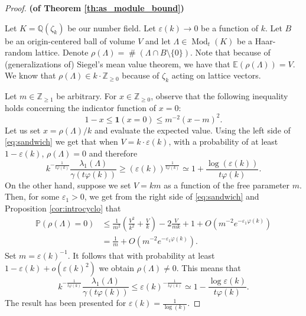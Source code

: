 \documentclass{amsart}
\DeclareMathOperator{\ML}{Mod}
\DeclareMathOperator{\card}{\texttt{\#}}
\begin{document}
 \begin{proof} 
 {\bf (of Theorem \ref{th:as_module_bound})}

 Let $K = \mathbb{Q}(\zeta_{k})$ be our number field. Let $\varepsilon(k)\rightarrow 0$ be a function of $k$.
 Let $B$ be an origin-centered ball of volume $V$ and let $\Lambda \in \ML_{t}(K)$ be a Haar-random lattice.
 Denote $\rho(\Lambda) = \card ( \Lambda \cap B \setminus \{0\} )$.
 Note that because of (generalizations of) Siegel's mean value theorem, we have that 
 $\mathbb{E}(\rho(\Lambda))  = V$. We know that $\rho(\Lambda)\in k \cdot \mathbb{Z}_{\geq 0}$ because of $\zeta_k$ acting on lattice vectors. 

 Let $m \in \mathbb{Z}_{\geq 1}$ be arbitrary. For $x \in \mathbb{Z}_{\geq 0}$, observe that the following inequality holds concerning the indicator function of $x=0$:
 \begin{equation}
1- x\leq \mathbf{1}( x=0 ) \leq  {m}^{-2}(x-m)^{2}.
\label{eq:sandwich}
 \end{equation}
 Let us set $x= \rho(\Lambda)/k$ and evaluate the expected value.
 Using the left side of \ref{eq:sandwich}
 we get that when $V = k \cdot \varepsilon(k)$, with a probability of at least $1-\varepsilon(k)$, $\rho(\Lambda) = 0$ and therefore
 \begin{equation}
  k^{-\frac{1}{t \varphi(k)}}\frac{ \lambda_1(\Lambda) }{ \gamma( t  \varphi(k))} \geq  ( \varepsilon(k))^{\frac{1}{t \varphi(k)}} \simeq 1 + \frac{\log (\varepsilon(k))}{ t \varphi(k)}.
 \end{equation}
 On the other hand, suppose we set $V=km$ as a function of the free parameter $m$.
 Then, for some $\varepsilon_1 > 0$, 
 we get from the right side of \ref{eq:sandwich} and Proposition \ref{cor:introcyclo} that 
 \begin{align}
	 \mathbb{P}(\rho(\Lambda) = 0)  & \leq  \frac{1}{m^{2}}\left(\frac{V^{2}}{k^{2}} + \frac{V}{k}\right) - 2\frac{V}{mk} +1 + O(m^{-2}e^{- \varepsilon_1 \varphi(k)}) \\
					& =  \frac{1}{m} +  O(m^{-2}e^{- \varepsilon_1 \varphi(k)}) .
 \end{align}
 Set $m = \varepsilon(k)^{-1}$. It follows that with
 probability at least $1-\varepsilon(k) + o(\varepsilon(k)^2)$ we obtain $\rho(\Lambda) \neq 0$. This means that 
 \begin{equation}
   k^{-\frac{1}{t\varphi(k)}}\frac{\lambda_1(\Lambda)}{ \gamma(t \varphi(k))} 
   \leq \varepsilon(k)^{ - \frac{1}{t \varphi(k)}} \simeq 1- \frac{\log \varepsilon(k) }{t \varphi(k)}.
 \end{equation}
 The result has been presented for $\varepsilon(k) = \frac{1}{\log(k)}$.
 \end{proof}


% 



\end{document}
